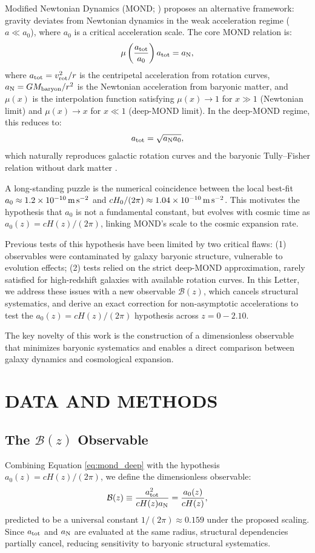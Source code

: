 \documentclass[fleqn,usenatbib]{mnras}
\newcommand{\Bz}{\mathcal{B}(z)}
\newcommand{\atot}{a_{\rm tot}}
\newcommand{\aN}{a_{\rm N}}
\newcommand{\aMOND}{a_0}
\newcommand{\Hz}{H(z)}
\newcommand{\Hzero}{H_0}
\begin{document}
Modified Newtonian Dynamics (MOND; \citealt{Milgrom1983}) proposes an alternative framework: gravity deviates from Newtonian dynamics in the weak acceleration regime ($a \ll \aMOND$), where $\aMOND$ is a critical acceleration scale. The core MOND relation is:
\begin{equation}
\mu\left(\frac{\atot}{\aMOND}\right) \atot = \aN,
\label{eq:mond_core}
\end{equation}
where $\atot = v_{\rm rot}^2 / r$ is the centripetal acceleration from rotation curves, $\aN = G M_{\rm baryon}/r^2$ is the Newtonian acceleration from baryonic matter, and $\mu(x)$ is the interpolation function satisfying $\mu(x) \to 1$ for $x \gg 1$ (Newtonian limit) and $\mu(x) \to x$ for $x \ll 1$ (deep-MOND limit). In the deep-MOND regime, this reduces to:
\begin{equation}
\atot = \sqrt{\aN \aMOND},
\label{eq:mond_deep}
\end{equation}
which naturally reproduces galactic rotation curves and the baryonic Tully–Fisher relation without dark matter \citep{Famaey2012}.

A long-standing puzzle is the numerical coincidence between the local best-fit $\aMOND \approx 1.2\times10^{-10}\,{\rm m\,s^{-2}}$ and $c\Hzero/(2\pi) \approx 1.04\times10^{-10}\,{\rm m\,s^{-2}}$. This motivates the hypothesis that $\aMOND$ is not a fundamental constant, but evolves with cosmic time as $\aMOND(z) = c\Hz/(2\pi)$, linking MOND's scale to the cosmic expansion rate.

Previous tests of this hypothesis have been limited by two critical flaws: (1) observables were contaminated by galaxy baryonic structure, vulnerable to evolution effects; (2) tests relied on the strict deep-MOND approximation, rarely satisfied for high-redshift galaxies with available rotation curves. In this Letter, we address these issues with a new observable $\Bz$, which cancels structural systematics, and derive an exact correction for non-asymptotic accelerations to test the $\aMOND(z) = c\Hz/(2\pi)$ hypothesis across $z=0-2.10$.

The key novelty of this work is the construction of a dimensionless observable that minimizes baryonic systematics and enables a direct comparison between galaxy dynamics and cosmological expansion.

\section{DATA AND METHODS}
\subsection{The \texorpdfstring{$\Bz$}{B(z)} Observable}
Combining Equation \ref{eq:mond_deep} with the hypothesis $\aMOND(z) = c\Hz/(2\pi)$, we define the dimensionless observable:
\begin{equation}
\Bz \equiv \frac{\atot^2}{c \Hz \aN} = \frac{\aMOND(z)}{c \Hz},
\label{eq:B_def}
\end{equation}
predicted to be a universal constant $1/(2\pi) \approx 0.159$ under the proposed scaling. Since $\atot$ and $\aN$ are evaluated at the same radius, structural dependencies partially cancel, reducing sensitivity to baryonic structural systematics.
\end{document}
